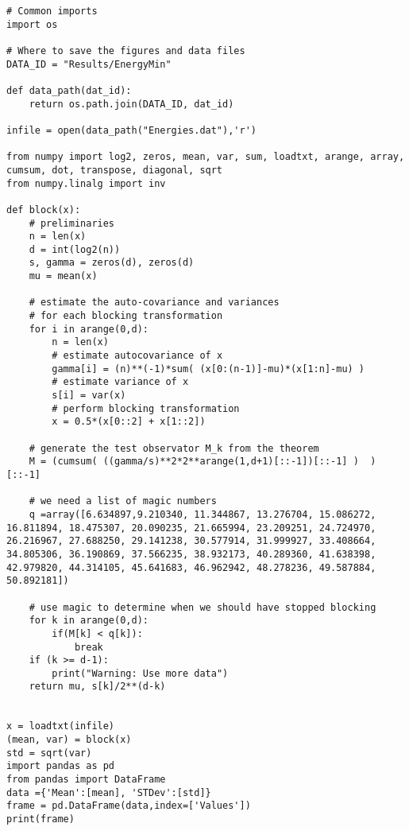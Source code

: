 \documentclass[%
oneside,                 %
final,                   %
10pt]{article}
\begin{document}
\begin{verbatim}
# Common imports
import os

# Where to save the figures and data files
DATA_ID = "Results/EnergyMin"

def data_path(dat_id):
    return os.path.join(DATA_ID, dat_id)

infile = open(data_path("Energies.dat"),'r')

from numpy import log2, zeros, mean, var, sum, loadtxt, arange, array, cumsum, dot, transpose, diagonal, sqrt
from numpy.linalg import inv

def block(x):
    # preliminaries
    n = len(x)
    d = int(log2(n))
    s, gamma = zeros(d), zeros(d)
    mu = mean(x)

    # estimate the auto-covariance and variances 
    # for each blocking transformation
    for i in arange(0,d):
        n = len(x)
        # estimate autocovariance of x
        gamma[i] = (n)**(-1)*sum( (x[0:(n-1)]-mu)*(x[1:n]-mu) )
        # estimate variance of x
        s[i] = var(x)
        # perform blocking transformation
        x = 0.5*(x[0::2] + x[1::2])
   
    # generate the test observator M_k from the theorem
    M = (cumsum( ((gamma/s)**2*2**arange(1,d+1)[::-1])[::-1] )  )[::-1]

    # we need a list of magic numbers
    q =array([6.634897,9.210340, 11.344867, 13.276704, 15.086272, 16.811894, 18.475307, 20.090235, 21.665994, 23.209251, 24.724970, 26.216967, 27.688250, 29.141238, 30.577914, 31.999927, 33.408664, 34.805306, 36.190869, 37.566235, 38.932173, 40.289360, 41.638398, 42.979820, 44.314105, 45.641683, 46.962942, 48.278236, 49.587884, 50.892181])

    # use magic to determine when we should have stopped blocking
    for k in arange(0,d):
        if(M[k] < q[k]):
            break
    if (k >= d-1):
        print("Warning: Use more data")
    return mu, s[k]/2**(d-k)


x = loadtxt(infile)
(mean, var) = block(x) 
std = sqrt(var)
import pandas as pd
from pandas import DataFrame
data ={'Mean':[mean], 'STDev':[std]}
frame = pd.DataFrame(data,index=['Values'])
print(frame)


\end{verbatim}


\end{document}
